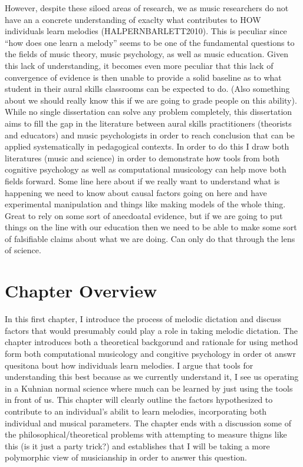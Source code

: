 \documentclass[]{book}
\theoremstyle{definition}
\theoremstyle{definition}
\theoremstyle{definition}
\theoremstyle{remark}
\begin{document}
However, despite these siloed areas of research, we as music researchers
do not have an a concrete understanding of exaclty what contributes to
HOW individuals learn melodies (HALPERNBARLETT2010). This is peculiar
since ``how does one learn a melody'' seems to be one of the fundamental
questions to the fields of music theory, music psychology, as well as
music education. Given this lack of understanding, it becomes even more
peculiar that this lack of convergence of evidence is then unable to
provide a solid baseline as to what student in their aural skills
classrooms can be expected to do. (Also something about we should really
know this if we are going to grade people on this ability). While no
single dissertation can solve any problem completely, this dissertation
aims to fill the gap in the literature between aural skills
practitioners (theorists and educators) and music psychologists in order
to reach conclusion that can be applied systematically in pedagogical
contexts. In order to do this I draw both literatures (music and
science) in order to demonstrate how tools from both cognitive
psychology as well as computational musicology can help move both fields
forward. Some line here about if we really want to understand what is
happening we need to know about causal factors going on here and have
experimental manipulation and things like making models of the whole
thing. Great to rely on some sort of anecdoatal evidence, but if we are
going to put things on the line with our education then we need to be
able to make some sort of falsifiable claims about what we are doing.
Can only do that through the lens of science.

\hypertarget{chapter-overview}{%
\section{Chapter Overview}\label{chapter-overview}}

In this first chapter, I introduce the process of melodic dictation and
discuss factors that would presumably could play a role in taking
melodic dictation. The chapter introduces both a theoretical backgorund
and rationale for using method form both computational musicology and
congitive psychology in order ot answr quesitona bout how individuals
learn melodies. I argue that tools for understanding this best because
as we currently understand it, I see us operating in a Kuhnian normal
science where much can be learned by just using the tools in front of
us. This chapter will clearly outline the factors hypothesized to
contribute to an individual's abilit to learn melodies, incorporating
both individual and musical parameters. The chapter ends with a
discussion some of the philosophical/theoretical problems with
attempting to measure thigns like this (is it just a party trick?) and
establishes that I will be taking a more polymorphic view of
musicianship in order to answer this question.
\end{document}
